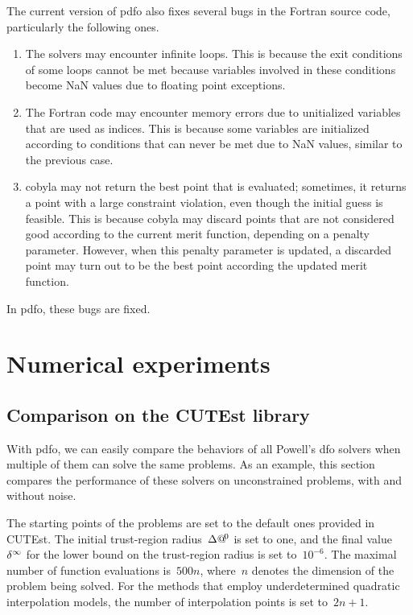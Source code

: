 The current version of \gls{pdfo} also fixes several bugs in the Fortran source code, particularly the following ones.
\begin{enumerate}
    \item The solvers may encounter infinite loops.
    This is because the exit conditions of some loops cannot be met because variables involved in these conditions become NaN values due to floating point exceptions.
    \item The Fortran code may encounter memory errors due to unitialized variables that are used as indices.
    This is because some variables are initialized according to conditions that can never be met due to NaN values, similar to the previous case.
    \item \Gls{cobyla} may not return the best point that is evaluated; sometimes, it returns a point with a large constraint violation, even though the initial guess is feasible.
    This is because \gls{cobyla} may discard points that are not considered good according to the current merit function, depending on a penalty parameter.
    However, when this penalty parameter is updated, a discarded point may turn out to be the best point according the updated merit function.
\end{enumerate}

In \gls{pdfo}, these bugs are fixed.


\section{Numerical experiments}
\label{sec:pdfo-experiments}

\subsection{Comparison on the CUTEst library}

With \gls{pdfo}, we can easily compare the behaviors of all Powell's \gls{dfo} solvers when multiple of them can solve the same problems.
As an example, this section compares the performance of these solvers on unconstrained problems, with and without noise.

The starting points of the problems are set to the default ones provided in CUTEst.
The initial trust-region radius~$\rad[0]$ is set to one, and the final value~$\radlb[\infty]$ for the lower bound on the trust-region radius is set to~$10^{-6}$.
The maximal number of function evaluations is~$500n$, where~$n$ denotes the dimension of the problem being solved.
For the methods that employ underdetermined quadratic interpolation models, the number of interpolation points is set to~$2n + 1$.

